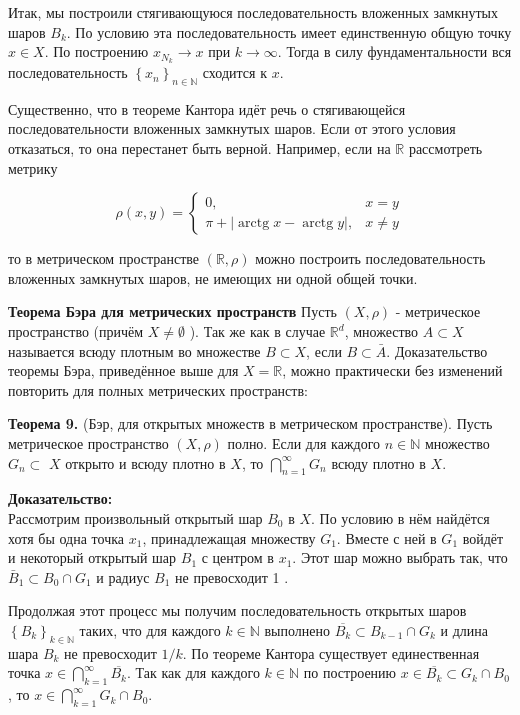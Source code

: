 \documentclass[a4paper,12pt]{article} %
\begin{document}
Итак, мы построили стягивающуюся последовательность вложенных замкнутых шаров $B_{k}$. По условию эта последовательность имеет единственную общую точку $x \in X$. По построению $x_{N_{k}} \rightarrow x$ при $k \rightarrow \infty$. Тогда в силу фундаментальности вся последовательность $\left\{x_{n}\right\}_{n \in \mathbb{N}}$ сходится к $x$.

Существенно, что в теореме Кантора идёт речь о стягивающейся последовательности вложенных замкнутых шаров. Если от этого условия отказаться, то она перестанет быть верной. Например, если на $\mathbb{R}$ рассмотреть метрику

$$
\rho(x, y)= \begin{cases}0, & x=y \\ \pi+|\operatorname{arctg} x-\operatorname{arctg} y|, & x \neq y\end{cases}
$$

то в метрическом пространстве $(\mathbb{R}, \rho)$ можно построить последовательность вложенных замкнутых шаров, не имеющих ни одной общей точки.

\textbf{Теорема Бэра для метрических пространств}
Пусть $(X, \rho)$ - метрическое пространство (причём $X \neq \emptyset$ ). Так же как в случае $\mathbb{R}^{d}$, множество $A \subset X$ называется всюду плотным во множестве $B \subset X$, если $B \subset \bar{A}$. Доказательство теоремы Бэра, приведённое выше для $X=\mathbb{R}$, можно практически без изменений повторить для полных метрических пространств:

\textbf{Теорема 9.} (Бэр, для открытых множеств в метрическом пространстве). Пусть метрическое пространство $(X, \rho)$ полно. Если для каждого $n \in \mathbb{N}$ множество $G_{n} \subset$ $X$ открыто и всюду плотно в $X$, то $\bigcap_{n=1}^{\infty} G_{n}$ всюду плотно в $X$.

\textbf{Доказательство:\\}
Рассмотрим произвольный открытый шар $B_{0}$ в $X$. По условию в нём найдётся хотя бы одна точка $x_{1}$, принадлежащая множеству $G_{1}$. Вместе с ней в $G_{1}$ войдёт и некоторый открытый шар $B_{1}$ с центром в $x_{1}$. Этот шар можно выбрать так, что $\bar{B}_{1} \subset B_{0} \cap G_{1}$ и радиус $B_{1}$ не превосходит 1 .

Продолжая этот процесс мы получим последовательность открытых шаров $\left\{B_{k}\right\}_{k \in \mathbb{N}}$ таких, что для каждого $k \in \mathbb{N}$ выполнено $\overline{B_{k}} \subset B_{k-1} \cap G_{k}$ и длина шара $B_{k}$ не превосходит $1 / k$. По теореме Кантора существует единественная точка $x \in \bigcap_{k=1}^{\infty} \overline{B_{k}}$. Так как для каждого $k \in \mathbb{N}$ по построению $x \in \overline{B_{k}} \subset G_{k} \cap B_{0}$, то $x \in \bigcap_{k=1}^{\infty} G_{k} \cap B_{0}$.
\end{document}

